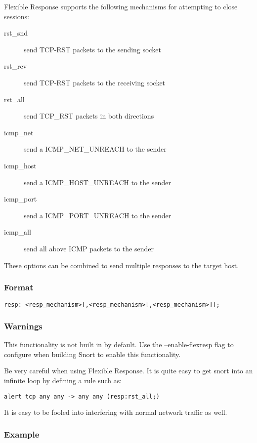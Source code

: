 \documentclass[english]{report}
\begin{document}
Flexible Response supports the following mechanisms for attempting to close
sessions:
\begin{description}
\item [rst\_snd] send TCP-RST packets to the sending socket 
\item [rst\_rcv] send TCP-RST packets to the receiving socket 
\item [rst\_all] send TCP\_RST packets in both directions 
\item [icmp\_net] send a ICMP\_NET\_UNREACH to the sender 
\item [icmp\_host] send a ICMP\_HOST\_UNREACH to the sender 
\item [icmp\_port] send a ICMP\_PORT\_UNREACH to the sender 
\item [icmp\_all] send all above ICMP packets to the sender
\end{description}

These options can be combined to send multiple responses to the target host.

\subsubsection{Format}

\begin{verbatim}
resp: <resp_mechanism>[,<resp_mechanism>[,<resp_mechanism>]];
\end{verbatim}

\subsubsection{Warnings}

This functionality is not built in by default.  Use the --enable-flexresp flag
to configure when building Snort to enable this functionality.

Be very careful when using Flexible Response. It is quite easy to get snort
into an infinite loop by defining a rule such as:

\begin{verbatim}
alert tcp any any -> any any (resp:rst_all;)
\end{verbatim}

It is easy to be fooled into interfering with normal network traffic as well.

\subsubsection{Example}
\end{document}
